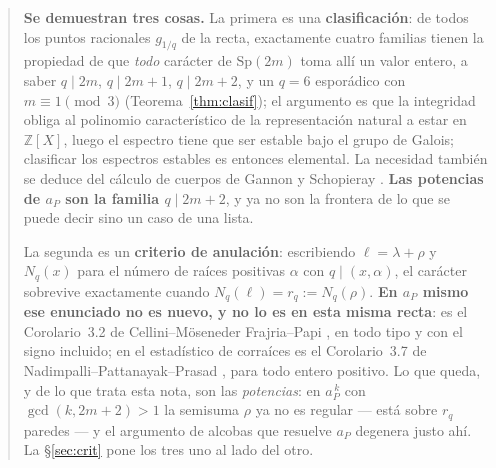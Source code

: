 \documentclass[11pt,a4paper]{article}
\newcommand{\Sp}{\mathrm{Sp}}
\begin{document}
\begin{abstract}
\smallskip
\noindent \textbf{Se demuestran tres cosas.} La primera es una \textbf{clasificación}: de
todos los puntos racionales $g_{1/q}$ de la recta, exactamente cuatro familias tienen la
propiedad de que \emph{todo} carácter de $\Sp(2m)$ toma allí un valor entero, a saber
$q\mid 2m$, $q\mid 2m+1$, $q\mid 2m+2$, y un $q=6$ esporádico con $m\equiv1\pmod3$ (Teorema~\ref{thm:clasif}); el
argumento es que la integridad obliga al polinomio característico de la representación natural
a estar en $\mathbb{Z}[X]$, luego el espectro tiene que ser estable bajo el grupo de Galois;
clasificar los espectros estables es entonces elemental. La necesidad también se deduce del cálculo de cuerpos de Gannon y Schopieray \cite{GS19}. \textbf{Las potencias de $a_P$ son la familia $q\mid 2m+2$}, y ya
no son la frontera de lo que se puede decir sino un caso de una lista.

\smallskip
\noindent La segunda es un \textbf{criterio de anulación}: escribiendo $\ell=\lambda+\rho$ y $N_q(x)$
para el número de raíces positivas $\alpha$ con $q\mid(x,\alpha)$, el carácter sobrevive exactamente
cuando $N_q(\ell)=r_q:=N_q(\rho)$. \textbf{En $a_P$ mismo ese enunciado no es nuevo, y no lo es en
esta misma recta}: es el Corolario~3.2 de Cellini--Möseneder Frajria--Papi \cite{CMP06}, en todo
tipo y con el signo incluido; en el estadístico de corraíces es el Corolario~3.7 de
Nadimpalli--Pattanayak--Prasad \cite{NPP25}, para todo entero positivo. Lo que queda, y de lo que
trata esta nota, son las \emph{potencias}: en $a_P^{\,k}$ con $\gcd(k,2m+2)>1$ la semisuma $\rho$ ya
no es regular --- está sobre $r_q$ paredes --- y el argumento de alcobas que resuelve $a_P$
degenera justo ahí. La \S\ref{sec:crit} pone los tres uno al lado del otro.


\end{abstract}
\end{document}
